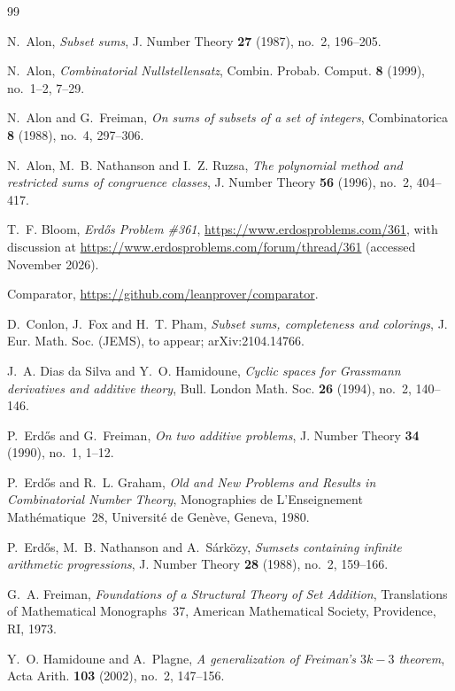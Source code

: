 \documentclass[11pt,reqno]{amsart}
\numberwithin{equation}{section}
\theoremstyle{definition}
\theoremstyle{remark}
\begin{document}
\begin{thebibliography}{99}

N.~Alon, \emph{Subset sums}, J. Number Theory \textbf{27} (1987), no.~2, 196--205.

N.~Alon, \emph{Combinatorial Nullstellensatz}, Combin. Probab. Comput. \textbf{8} (1999), no.~1--2, 7--29.

N.~Alon and G.~Freiman, \emph{On sums of subsets of a set of integers}, Combinatorica \textbf{8} (1988), no.~4, 297--306.

N.~Alon, M.~B. Nathanson and I.~Z. Ruzsa, \emph{The polynomial method and restricted sums of congruence classes}, J. Number Theory \textbf{56} (1996), no.~2, 404--417.

T.~F. Bloom, \emph{Erd\H{o}s Problem \#361}, \url{https://www.erdosproblems.com/361}, with discussion at \url{https://www.erdosproblems.com/forum/thread/361} (accessed November 2026).

Comparator, \url{https://github.com/leanprover/comparator}.

D.~Conlon, J.~Fox and H.~T. Pham, \emph{Subset sums, completeness and colorings}, J. Eur. Math. Soc. (JEMS), to appear; arXiv:2104.14766.

J.~A. Dias da Silva and Y.~O. Hamidoune, \emph{Cyclic spaces for Grassmann derivatives and additive theory}, Bull. London Math. Soc. \textbf{26} (1994), no.~2, 140--146.

P.~Erd\H{o}s and G.~Freiman, \emph{On two additive problems}, J. Number Theory \textbf{34} (1990), no.~1, 1--12.

P.~Erd\H{o}s and R.~L. Graham, \emph{Old and New Problems and Results in Combinatorial Number Theory}, Monographies de L'Enseignement Math\'ematique~28, Universit\'e de Gen\`eve, Geneva, 1980.

P.~Erd\H{o}s, M.~B. Nathanson and A.~S\'ark\"ozy, \emph{Sumsets containing infinite arithmetic progressions}, J. Number Theory \textbf{28} (1988), no.~2, 159--166.

G.~A. Freiman, \emph{Foundations of a Structural Theory of Set Addition}, Translations of Mathematical Monographs~37, American Mathematical Society, Providence, RI, 1973.

Y.~O. Hamidoune and A.~Plagne, \emph{A generalization of Freiman's $3k-3$ theorem}, Acta Arith. \textbf{103} (2002), no.~2, 147--156.


\end{thebibliography}
\end{document}

